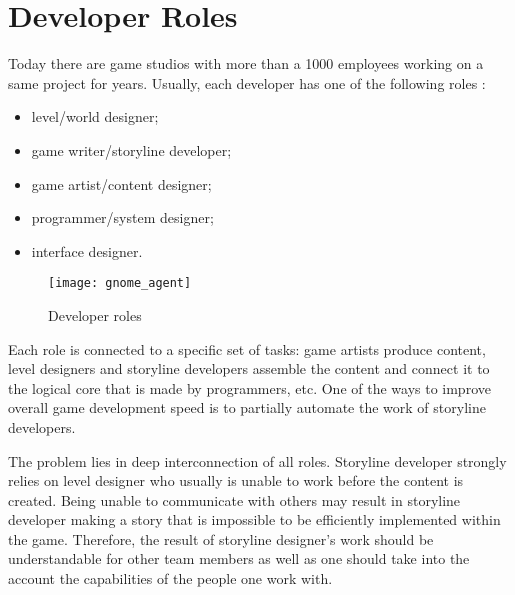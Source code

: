 \section{Developer Roles}
Today there are game studios with more than a 1000 employees working on a same project for years.
Usually, each developer has one of the following roles \cite{wikiGameDev}:
\begin{itemize}
 \item level/world designer;
 \item game writer/storyline developer;
 \item game artist/content designer;
 \item programmer/system designer;
 \item interface designer.
\end{itemize}
\begin{figure}[h!]
     \begin{center}
      \texttt{[image: gnome\_agent]}
      \caption{Developer roles}
      \end{center}
\end{figure}
Each role is connected to a specific set of tasks: game artists produce content, level designers and storyline developers assemble the content and connect it to the logical core that is made by programmers, etc. One of the ways to improve overall game development speed is  to partially automate the work of storyline developers.\

The problem lies in deep interconnection of all roles. Storyline developer strongly relies on level designer who usually is unable to work before the content is created. Being unable to communicate with others may result in storyline developer making a story that is impossible to be efficiently implemented within the game. Therefore, the result of storyline designer's work should be understandable for other team members as well as one should take into the account the capabilities of the people one work with. 